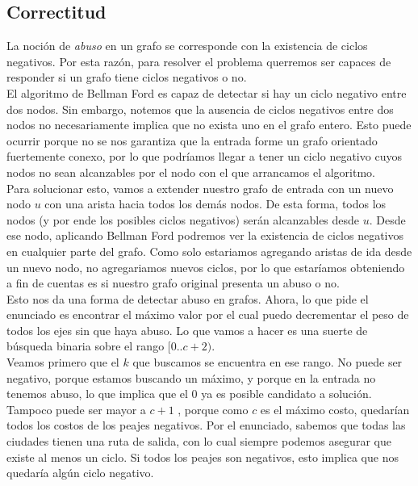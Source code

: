 \subsection{Correctitud}

La noción de \textit{abuso} en un grafo se corresponde con la existencia de ciclos negativos. Por esta razón, para resolver el problema querremos ser capaces de responder si un grafo tiene ciclos negativos o no. \\

El algoritmo de Bellman Ford es capaz de detectar si hay un ciclo negativo entre dos nodos. Sin embargo, notemos que la ausencia de ciclos negativos entre dos nodos no necesariamente implica que no exista uno en el grafo entero. Esto puede ocurrir porque no se nos garantiza que la entrada forme un grafo orientado fuertemente conexo, por lo que podríamos llegar a tener un ciclo negativo cuyos nodos no sean alcanzables por el nodo con el que 	arrancamos el algoritmo. \\

Para solucionar esto, vamos a extender nuestro grafo de entrada con un nuevo nodo $u$ con una arista hacia todos los demás nodos. De esta forma, todos los nodos (y por ende los posibles ciclos negativos) serán alcanzables desde $u$. Desde ese nodo, aplicando Bellman Ford podremos ver la existencia de ciclos negativos en cualquier parte del grafo. Como solo estariamos agregando aristas de ida desde un nuevo nodo, no agregariamos nuevos ciclos, por lo que estaríamos obteniendo a fin de cuentas es si nuestro grafo original presenta un abuso o no. \\

Esto nos da una forma de detectar abuso en grafos. Ahora, lo que pide el enunciado es encontrar el máximo valor por el cual puedo decrementar el peso de todos los ejes sin que haya abuso. Lo que vamos a hacer es una suerte de búsqueda binaria sobre el rango $[0..c+2)$. \\

Veamos primero que el $k$ que buscamos se encuentra en ese rango. No puede ser negativo, porque estamos buscando un máximo, y porque en la entrada no tenemos abuso, lo que implica que el $0$ ya es posible candidato a solución. Tampoco puede ser mayor a $c+1$ , porque como $c$ es el máximo costo, quedarían todos los costos de los peajes negativos. Por el enunciado, sabemos que todas las ciudades tienen una ruta de salida, con lo cual siempre podemos asegurar que existe al menos un ciclo. Si todos los peajes son negativos, esto implica que nos quedaría algún ciclo negativo. \\

